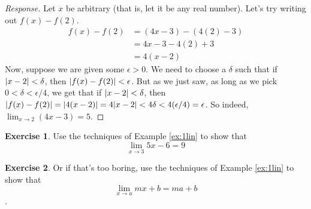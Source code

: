 \documentclass[english]{book}
\DeclarePairedDelimiter\abs{\lvert}{\rvert}%
\theoremstyle{remark}
\theoremstyle{definition}
\newtheorem{excs}{Exercise}
\newtheorem*{next week}{Next Week}
\newcommand{\dlim}{\displaystyle\lim}
\begin{document}
\begin{proof}[Response]
	 Let $x$ be arbitrary (that is, let it be any real number). Let's try writing out $f(x)-f(2)$.
	 \begin{align*}
	 	f(x)-f(2)&=(4x-3)-(4(2)-3)\\
	 	&=4x-3-4(2)+3\\
	 	&=4(x-2)
	 \end{align*}
 Now, suppose we are given some $\epsilon>0$. We need to choose a $\delta$ such that if $\abs{x-2}<\delta$, then $\abs{f(x)-f(2)}<\epsilon$. But as we just saw, as long as we pick $0<\delta<\epsilon/4$, we get that if $\abs{x-2}<\delta$, then $\abs{f(x)-f(2)}=\abs{4(x-2)}=4\abs{x-2}<4\delta<4(\epsilon/4)=\epsilon$. So indeed, $\dlim_{x\to 2}(4x-3)=5$. 
\end{proof}

\begin{excs}
	Use the techniques of Example \ref{ex:1lin} to show that $$\lim_{x\to 3}5x-6=9$$
\end{excs}
\begin{excs}
	Or if that's too boring, use the techniques of Example \ref{ex:1lin} to show that $$\lim_{x\to a}mx+b=ma+b$$. 
\end{excs}
\end{document}
